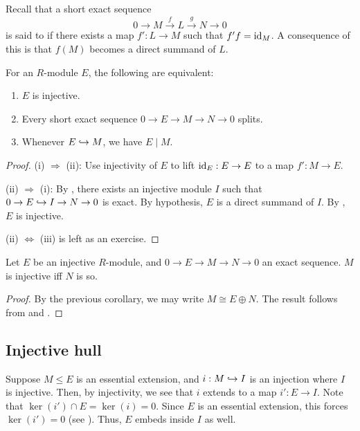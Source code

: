Recall that a short exact sequence
\begin{equation*} 
	0 \to M \xrightarrow{f} L \xrightarrow{g} N \to 0
\end{equation*} 
is said to  if there exists a map $f' : L \to M$ such that $f'f = \operatorname{id}_{M}$. A consequence of this is that $f(M)$ becomes a direct summand of $L$.

\begin{cor} \label{cor:injective-splits}
	For an $R$-module $E$, the following are equivalent:
	\begin{enumerate}[label=(\roman*)]
		\item $E$ is injective.
		\item Every short exact sequence $0 \to E \to M \to N \to 0$ splits.
		\item Whenever $E \hookrightarrow M$, we have $E \mid M$.
	\end{enumerate}
\end{cor}
\begin{proof}
	(i) $\Rightarrow$ (ii): Use injectivity of $E$ to lift $\operatorname{id}_{E} : E \to E$ to a map $f' : M \to E$.

	(ii) $\Rightarrow$ (i): By , there exists an injective module $I$ such that $0 \to E \hookrightarrow I \to N \to 0$ is exact. By hypothesis, $E$ is a direct summand of $I$. By , $E$ is injective.

	(ii) $\Leftrightarrow$ (iii) is left as an exercise. 
\end{proof}

\begin{cor}
	Let $E$ be an injective $R$-module, and $0 \to E \to M \to N \to 0$ an exact sequence. $M$ is injective iff $N$ is so.
\end{cor}
\begin{proof} 
	By the previous corollary, we may write $M \cong E \oplus N$. The result follows from  and .
\end{proof}

\subsection{Injective hull}

Suppose $M \le E$ is an essential extension, and $i : M \hookrightarrow I$ is an injection where $I$ is injective. Then, by injectivity, we see that $i$ extends to a map $i' : E \to I$. Note that $\ker(i') \cap E = \ker(i) = 0$. Since $E$ is an essential extension, this forces $\ker(i') = 0$ (see ). Thus, $E$ embeds inside $I$ as well. 

